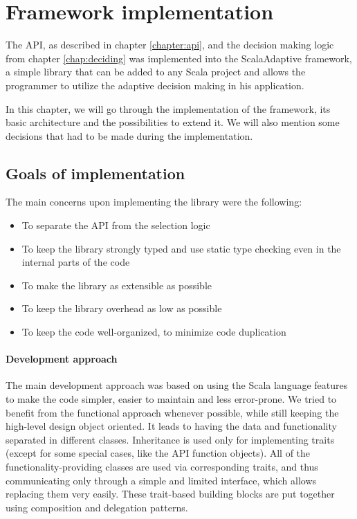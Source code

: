 \chapter{Framework implementation}
\label{chap:implementation}

The API, as described in chapter \ref{chapter:api}, and the decision making logic from chapter \ref{chap:deciding} was implemented into the ScalaAdaptive framework, a simple library that can be added to any Scala project and allows the programmer to utilize the adaptive decision making in his application.

In this chapter, we will go through the implementation of the framework, its basic architecture and the possibilities to extend it. We will also mention some decisions that had to be made during the implementation.

\section{Goals of implementation}

The main concerns upon implementing the library were the following:

\begin{itemize}
	\item To separate the API from the selection logic
	\item To keep the library strongly typed and use static type checking even in the internal parts of the code
	\item To make the library as extensible as possible
	\item To keep the library overhead as low as possible
	\item To keep the code well-organized, to minimize code duplication
\end{itemize}

\subsubsection{Development approach}

The main development approach was based on using the Scala language features to make the code simpler, easier to maintain and less error-prone. We tried to benefit from the functional approach whenever possible, while still keeping the high-level design object oriented. It leads to having the data and functionality separated in different classes. Inheritance is used only for implementing traits (except for some special cases, like the API function objects). All of the functionality-providing classes are used via corresponding traits, and thus communicating only through a simple and limited interface, which allows replacing them very easily. These trait-based building blocks are put together using composition and delegation patterns.

